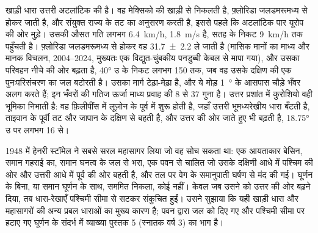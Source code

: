 खाड़ी धारा उत्तरी अटलांटिक की  है। वह मेक्सिको की खाड़ी से निकलती है, फ़्लोरिडा जलडमरूमध्य से होकर जाती है, और संयुक्त राज्य के तट का अनुसरण करती है, इससे पहले कि अटलांटिक पार यूरोप की ओर मुड़े। उसकी औसत गति लगभग \qty{6.4}{km/h}, \qty{1.8}{m/s} है, सतह के निकट \qty{9}{km/h} तक पहुँचती है। फ़्लोरिडा जलडमरूमध्य से होकर वह \qty[uncertainty-mode=separate]{31.7 \pm 2.2}{\sverdrup} ले जाती है (मासिक मानों का माध्य और मानक विचलन, 2004--2024, मुख्यतः एक विद्युत-चुंबकीय पनडुब्बी केबल से मापा गया), और उसका परिवहन नीचे की ओर बढ़ता है, \ang{40} उ के निकट लगभग \qty{150}{\sverdrup} तक, जब वह उसके दक्षिण की एक पुनःपरिसंचरण का जल बटोरती है। उसका मार्ग टेढ़ा-मेढ़ा है, और ये मोड़ \qty{1}{\degree} के आसपास चौड़े भँवर अलग करते हैं; इन भँवरों की गतिज ऊर्जा माध्य प्रवाह की \num{8} से \num{37} गुना है। उत्तर प्रशांत में कुरोशियो वही भूमिका निभाती है: वह फ़िलीपींस में लूज़ोन के पूर्व में शुरू होती है, जहाँ उत्तरी भूमध्यरेखीय धारा बँटती है, ताइवान के पूर्वी तट और जापान के दक्षिण से बहती है, और उत्तर की ओर जाते हुए भी बढ़ती है, \ang{18.75} उ पर लगभग \qty{16}{\sverdrup} से।

\begin{history}[स्टॉमेल 1948]
1948 में हेनरी स्टॉमेल ने सबसे सरल महासागर लिया जो वह सोच सकता था: एक आयताकार बेसिन, समान गहराई का, समान घनत्व के जल से भरा, एक पवन से चालित जो उसके दक्षिणी आधे में पश्चिम की ओर और उत्तरी आधे में पूर्व की ओर बहती है, और तल पर वेग के समानुपाती घर्षण से मंद की गई। घूर्णन के बिना, या समान घूर्णन के साथ,  सममित निकला, कोई  नहीं। केवल जब उसने  को उत्तर की ओर बढ़ने दिया, तब धारा-रेखाएँ पश्चिमी सीमा से सटकर संकुचित हुईं। उसने सुझाया कि यही खाड़ी धारा और महासागरों की अन्य प्रबल धाराओं का मुख्य कारण है; पवन द्वारा जल को दिए गए और पश्चिमी सीमा पर हटाए गए घूर्णन के संदर्भ में व्याख्या पुस्तक 5 (स्नातक वर्ष 3) का भाग है।
\end{history}

